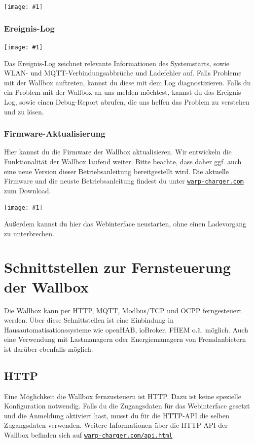\documentclass[a4paper,10pt]{article}
\newcommand{\gfx}[1]{\texttt{[image: \#1]}}
\newcommand\rurl[2]{%
  \href{#1}{\nolinkurl{#2}}%
}
\begin{document}
\begin{multicols*}{2}
    \gfx{./img_warp2/resized/web_ntp}

    \subsubsection{Ereignis-Log}
    \gfx{./img_warp2/resized/web_event_log}

    Das Ereignis-Log zeichnet relevante Informationen des Systemstarts, sowie WLAN- und MQTT-Verbindungsabbrüche und Ladefehler auf.
    Falls Probleme mit der Wallbox auftreten, kannst du diese mit dem Log diagnostizieren.
    Falls du ein Problem mit der Wallbox an uns melden möchtest, kannst du das Ereignis-Log,
    sowie einen Debug-Report abrufen, die uns helfen das Problem zu verstehen und zu lösen.

    \subsubsection{Firmware-Aktualisierung}\label{firmware-update}
    Hier kannst du die Firmware der Wallbox aktualisieren. Wir entwickeln die Funktionalität
    der Wallbox laufend weiter. Bitte beachte, dass daher ggf. auch eine neue
    Version dieser Betriebsanleitung bereitgestellt wird.
    Die aktuelle Firmware und die neuste Betriebsanleitung findest du unter
    \rurl{https://warp-charger.com}{warp-charger.com} zum Download.

    \gfx{./img_warp2/resized/web_firmware_update}

    Außerdem kannst du hier das Webinterface neustarten, ohne einen Ladevorgang zu unterbrechen.

    \newpage

    \section{Schnittstellen zur Fernsteuerung der Wallbox}\label{interfaces}
    Die Wallbox kann per HTTP, MQTT, Modbus/TCP und OCPP ferngesteuert werden. Über diese Schnittstellen ist eine
    Einbindung in Hausautomatisationssysteme wie openHAB, ioBroker, FHEM o.ä.
    möglich. Auch eine Verwendung mit Lastmanagern oder Energiemanagern von Fremdanbietern
    ist darüber ebenfalls möglich.

    \subsection{HTTP}\label{http-interface}
    Eine Möglichkeit die Wallbox fernzusteuern ist HTTP. Dazu ist keine
    spezielle Konfiguration notwendig. Falls du die Zugangsdaten für das Webinterface gesetzt und die Anmeldung aktiviert hast, musst du
    für die HTTP-API die selben Zugangsdaten verwenden.
    Weitere Informationen über die HTTP-API der Wallbox befinden sich auf \rurl{https://warp-charger.com/api.html}{warp-charger.com/api.html}



\end{multicols*}
\end{document}
